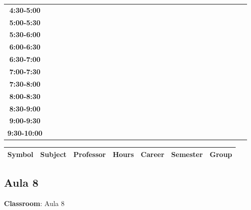 \documentclass{article}
\begin{document}
\begin{table}[ht]
\begin{tabular}{|c|c|c|c|c|c|c|c|c|c|c|c|c|c|c|c|c|c|c|c|c|c|c|c|c|c|c|c|c|c|}
 \cline{1-8} 
\textbf{4:30-5:00} &   &   &   &   &   &   &   \\
 \cline{1-8} 
\textbf{5:00-5:30} &   &   &   &   &   &   &   \\
 \cline{1-8} 
\textbf{5:30-6:00} &   &   &   &   &   &   &   \\
 \cline{1-8} 
\textbf{6:00-6:30} &   &   &   &   &   &   &   \\
 \cline{1-8} 
\textbf{6:30-7:00} &   &   &   &   &   &   &   \\
 \cline{1-8} 
\textbf{7:00-7:30} &   &   &   &   &   &   &   \\
 \cline{1-8} 
\textbf{7:30-8:00} &   &   &   &   &   &   &   \\
 \cline{1-8} 
\textbf{8:00-8:30} &   &   &   &   &   &   &   \\
 \cline{1-8} 
\textbf{8:30-9:00} &   &   &   &   &   &   &   \\
 \cline{1-8} 
\textbf{9:00-9:30} &   &   &   &   &   &   &   \\
 \cline{1-8} 
\textbf{9:30-10:00} &   &   &   &   &   &   &   \\
 \cline{1-8} 
\end{tabular}\end{table}

        
        \begin{tabular}{|>{\centering\arraybackslash}m{2cm}|>{\centering\arraybackslash}m{4cm}|>{\centering\arraybackslash}m{2.15cm}|>{\centering\arraybackslash}m{1.8cm}|>{\centering\arraybackslash}m{2cm}|>{\centering\arraybackslash}m{2cm}|>{\centering\arraybackslash}m{2cm}|}
        \hline
        \textbf{Symbol} & \textbf{Subject} & \textbf{Professor} & \textbf{Hours} & \textbf{Career} & \textbf{Semester} & \textbf{Group} \\
        \hline
        \end{tabular}
                    

        \newpage
        

        \subsection{Aula 8}
        \vspace*{.1cm}
        
        \begin{flushright}
            {\LARGE \textbf{Classroom}: Aula 8}
        \end{flushright}
        \vspace{1cm}
\end{document}
